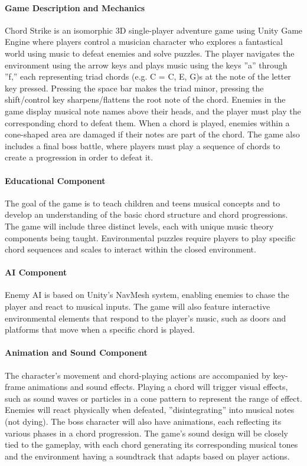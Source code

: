 \documentclass[11pt]{article}
\begin{document}
\maketitle

\paragraph*{Game Description and Mechanics}
Chord Strike is an isomorphic 3D single-player adventure
game using Unity Game Engine where players control a musician character who explores a fantastical world using music to defeat enemies and solve puzzles. 
The player navigates the environment using the arrow keys and plays music using the keys ”a” through ”f,” each representing triad chords
(e.g. C = C, E, G)s at the note of the letter key pressed. Pressing the space bar makes the triad
minor, pressing the shift/control key sharpens/flattens the root note of the chord. Enemies in the
game display musical note names above their heads, and the player must play the corresponding
chord to defeat them. When a chord is played, enemies within a cone-shaped area are damaged if
their notes are part of the chord. The game also includes a final boss battle, where players must
play a sequence of chords to create a progression in order to defeat it.

\paragraph*{Educational Component}
The goal of the game is to teach children and teens musical concepts
and to develop an understanding of the basic chord structure and chord progressions. The game
will include three distinct levels, each with unique music theory components being taught. 
Environmental puzzles require players to play specific chord sequences and scales to interact within the
closed environment.

\paragraph*{AI Component}
Enemy AI is based on Unity’s NavMesh system, enabling enemies to chase the
player and react to musical inputs. The game will also feature interactive environmental elements
that respond to the player’s music, such as doors and platforms that move when a specific chord is
played.

\paragraph*{Animation and Sound Component}
The character’s movement and chord-playing actions are
accompanied by key-frame animations and sound effects. Playing a chord will trigger visual effects,
such as sound waves or particles in a cone pattern to represent the range of effect. Enemies will
react physically when defeated, ”disintegrating” into musical notes (not dying). The boss character
will also have animations, each reflecting its various phases in a chord progression. The game’s
sound design will be closely tied to the gameplay, with each chord generating its corresponding
musical tones and the environment having a soundtrack that adapts based on player actions.
\end{document}
